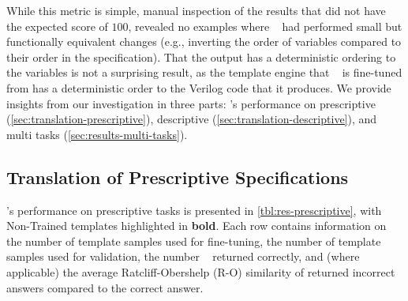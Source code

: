 While this metric is simple, %
manual inspection of the results that did not have the expected score of $100$, revealed no examples where \sol~ had performed small but functionally equivalent changes (e.g., inverting the order of variables compared to their order in the specification). That the output has a deterministic ordering to the variables is not a surprising result, as the template engine that \sol~ is fine-tuned from has a deterministic order to the Verilog code that it produces. We provide insights from our investigation in three parts: \sol's performance on prescriptive (\autoref{sec:translation-prescriptive}), descriptive (\autoref{sec:translation-descriptive}), and multi tasks (\autoref{sec:results-multi-tasks}).

\subsection{Translation of Prescriptive Specifications}
\label{sec:translation-prescriptive}



\sol's performance on prescriptive tasks is presented in \autoref{tbl:res-prescriptive}, with Non-Trained templates highlighted in \textbf{bold}. Each row contains information on the number of template samples used for fine-tuning, the number of template samples used for validation, the number \sol~ returned correctly, and (where applicable) the average Ratcliff-Obershelp (R-O) similarity of returned incorrect answers compared to the correct answer.

